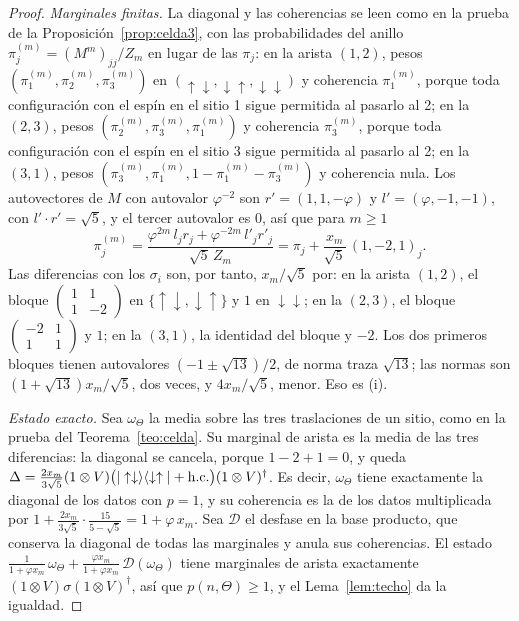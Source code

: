 \documentclass[11pt,a4paper]{article}
\theoremstyle{remark}
\newcommand{\ket}[1]{|#1\rangle}
\newcommand{\bra}[1]{\langle #1|}
\begin{document}
\begin{proof}
\emph{Marginales finitas.} La diagonal y las coherencias se leen como en la prueba de la
Proposición~\ref{prop:celda3}, con las probabilidades del anillo
$\pi^{(m)}_j=(M^m)_{jj}/Z_m$ en lugar de las $\pi_j$: en la arista $(1,2)$, pesos
$(\pi^{(m)}_1,\pi^{(m)}_2,\pi^{(m)}_3)$ en $(\uparrow\downarrow,\downarrow\uparrow,
\downarrow\downarrow)$ y coherencia $\pi^{(m)}_1$, porque toda configuración con el espín en el
sitio 1 sigue permitida al pasarlo al 2; en la $(2,3)$, pesos $(\pi^{(m)}_2,\pi^{(m)}_3,
\pi^{(m)}_1)$ y coherencia $\pi^{(m)}_3$, porque toda configuración con el espín en el sitio 3
sigue permitida al pasarlo al 2; en la $(3,1)$, pesos $(\pi^{(m)}_3,\pi^{(m)}_1,1-\pi^{(m)}_1-
\pi^{(m)}_3)$ y coherencia nula. Los autovectores de $M$ con autovalor $\varphi^{-2}$ son
$r'=(1,1,-\varphi)$ y $l'=(\varphi,-1,-1)$, con $l'\cdot r'=\sqrt5$, y el tercer autovalor es $0$,
así que para $m\ge1$
\[
  \pi^{(m)}_j=\frac{\varphi^{2m}\,l_jr_j+\varphi^{-2m}\,l'_jr'_j}{\sqrt5\,Z_m}
  =\pi_j+\frac{x_m}{\sqrt5}\,(1,-2,1)_j .
\]
Las diferencias con los $\sigma_i$ son, por tanto, $x_m/\sqrt5$ por: en la arista $(1,2)$, el bloque
$\left(\begin{smallmatrix}1&1\\1&-2\end{smallmatrix}\right)$ en $\{\uparrow\downarrow,
\downarrow\uparrow\}$ y $1$ en $\downarrow\downarrow$; en la $(2,3)$, el bloque
$\left(\begin{smallmatrix}-2&1\\1&1\end{smallmatrix}\right)$ y $1$; en la $(3,1)$, la identidad
del bloque y $-2$. Los dos primeros bloques tienen autovalores $(-1\pm\sqrt{13})/2$, de norma
traza $\sqrt{13}$; las normas son $(1+\sqrt{13})x_m/\sqrt5$, dos veces, y $4x_m/\sqrt5$, menor.
Eso es (i).

\emph{Estado exacto.} Sea $\omega_\Theta$ la media sobre las tres traslaciones de un sitio, como
en la prueba del Teorema~\ref{teo:celda}. Su marginal de arista es la media de las tres
diferencias: la diagonal se cancela, porque $1-2+1=0$, y queda
$\Delta=\frac{2x_m}{3\sqrt5}(1\otimes V)\big(\ket{\uparrow\downarrow}\bra{\downarrow\uparrow}+
{\rm h.c.}\big)(1\otimes V)^\dagger$. Es decir, $\omega_\Theta$ tiene exactamente la diagonal de los
datos con $p=1$, y su coherencia es la de los datos multiplicada por
$1+\frac{2x_m}{3\sqrt5}\cdot\frac{15}{5-\sqrt5}=1+\varphi\,x_m$. Sea $\mathcal D$ el desfase en la
base producto, que conserva la diagonal de todas las marginales y anula sus coherencias. El estado
$\frac1{1+\varphi x_m}\,\omega_\Theta+\frac{\varphi x_m}{1+\varphi x_m}\,\mathcal D(\omega_\Theta)$
tiene marginales de arista exactamente $(1\otimes V)\sigma(1\otimes V)^\dagger$, así que
$p(n,\Theta)\ge1$, y el Lema~\ref{lem:techo} da la igualdad.
\end{proof}
\end{document}
